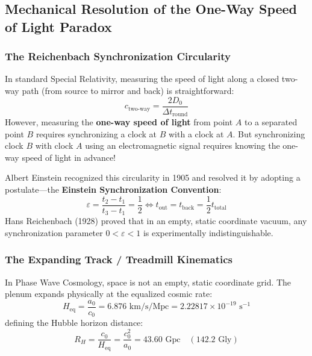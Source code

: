 \documentclass[11pt,a4paper]{article}
\begin{document}
\subsection{Mechanical Resolution of the One-Way Speed of Light Paradox}
\label{subsec:one_way_speed_resolution}

\subsubsection{The Reichenbach Synchronization Circularity}

In standard Special Relativity, measuring the speed of light along a closed two-way path (from source to mirror and back) is straightforward:
\begin{equation}
c_{\text{two-way}} = \frac{2 D_0}{\Delta t_{\text{round}}}
\end{equation}
However, measuring the \textbf{one-way speed of light} from point $A$ to a separated point $B$ requires synchronizing a clock at $B$ with a clock at $A$. But synchronizing clock $B$ with clock $A$ using an electromagnetic signal requires knowing the one-way speed of light in advance!

Albert Einstein recognized this circularity in 1905 and resolved it by adopting a postulate---the \textbf{Einstein Synchronization Convention}:
\begin{equation}
\varepsilon = \frac{t_2 - t_1}{t_3 - t_1} = \frac{1}{2} \iff t_{\text{out}} = t_{\text{back}} = \frac{1}{2} t_{\text{total}}
\end{equation}
Hans Reichenbach (1928) proved that in an empty, static coordinate vacuum, any synchronization parameter $0 < \varepsilon < 1$ is experimentally indistinguishable.

\subsubsection{The Expanding Track / Treadmill Kinematics}

In Phase Wave Cosmology, space is not an empty, static coordinate grid. The plenum expands physically at the equalized cosmic rate:
\begin{equation}
H_{\text{eq}} = \frac{a_0}{c_0} = 6.876\text{ km/s/Mpc} = 2.22817 \times 10^{-19}\text{ s}^{-1}
\end{equation}
defining the Hubble horizon distance:
\begin{equation}
R_H = \frac{c_0}{H_{\text{eq}}} = \frac{c_0^2}{a_0} = 43.60\text{ Gpc} \quad (142.2\text{ Gly})
\end{equation}
\end{document}
